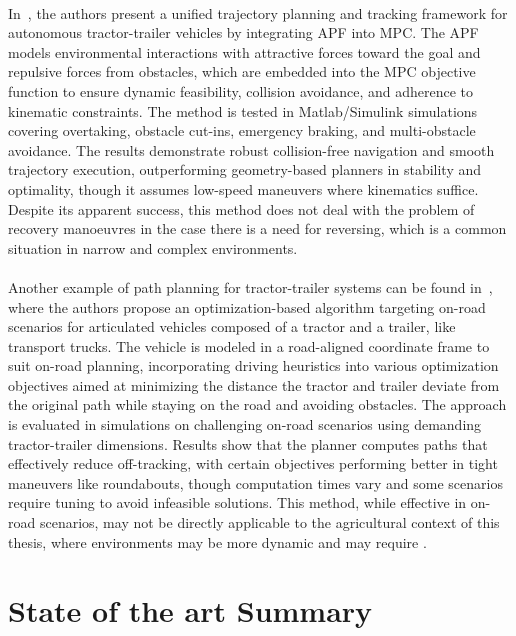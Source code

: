 \paragraph{}In~\cite{APFAPP}, the authors present a unified trajectory planning and tracking framework for 
autonomous tractor-trailer vehicles by integrating \gls{APF} into \gls{MPC}. 
The APF models environmental interactions with attractive forces toward the goal and repulsive forces 
from obstacles, which are embedded into the \gls{MPC} objective function to ensure dynamic feasibility, collision avoidance, 
and adherence to kinematic constraints. The method is tested in Matlab/Simulink simulations covering overtaking, 
obstacle cut-ins, emergency braking, and multi-obstacle avoidance. The results demonstrate robust collision-free 
navigation and smooth trajectory execution, outperforming geometry-based planners in stability and optimality, 
though it assumes low-speed maneuvers where kinematics suffice. Despite its apparent success, this method does not 
deal with the problem of recovery manoeuvres in the case there is a need for reversing, which is 
a common situation in narrow and complex environments.

\paragraph{}Another example of path planning for tractor-trailer systems can be found in~\cite{lastapp}, 
where the authors propose an optimization-based algorithm targeting on-road scenarios for articulated vehicles 
composed of a tractor and a trailer, like transport trucks. The vehicle is modeled in a road-aligned coordinate frame to suit on-road 
planning, incorporating driving heuristics into various optimization objectives aimed at minimizing the distance the tractor and trailer 
deviate from the original path while staying on the road and avoiding obstacles. The approach is evaluated in 
simulations on challenging on-road scenarios using demanding tractor-trailer dimensions. Results show that the planner 
computes paths that effectively reduce off-tracking, with certain objectives performing better in tight maneuvers like 
roundabouts, though computation times vary and some scenarios require tuning to avoid infeasible solutions. This method, 
while effective in on-road scenarios, may not be directly applicable to the agricultural context of this thesis, 
where environments may be more dynamic and may require .

\section{State of the art Summary}
